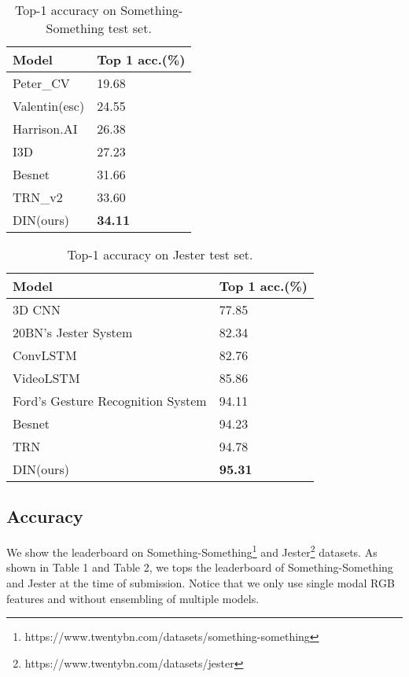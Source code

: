 \documentclass{article}
\begin{document}
\begin{table}[t]
\centering
\renewcommand\arraystretch{1.2}
\caption{Top-1 accuracy on Something-Something test set.}
\begin{tabular}{p{5cm} p{2cm}<{\centering}}
\toprule[1.4pt]
Model&Top 1 acc.(\%)\\
\hline
Peter\_CV&19.68\\
Valentin(esc)&24.55\\
Harrison.AI&26.38\\
I3D&27.23\\
Besnet&31.66\\
TRN\_v2&33.60\\
\hline
DIN(ours)&\textbf{34.11}\\

\bottomrule[1.5pt]

\end{tabular}
\end{table}


\begin{table}[t]
\centering
\renewcommand\arraystretch{1.2}
\caption{Top-1 accuracy on Jester test set.}
\begin{tabular}{p{5cm} p{2cm}<{\centering}}
\toprule[1.4pt]
Model&Top 1 acc.(\%)\\
\hline
3D CNN&77.85\\
20BN's Jester System&82.34\\
ConvLSTM&82.76\\
VideoLSTM&85.86\\
Ford's Gesture Recognition System&94.11\\
Besnet&94.23\\
TRN&94.78\\
\hline
DIN(ours)&\textbf{95.31}\\

\bottomrule[1.5pt]

\end{tabular}
\end{table}

\subsection{Accuracy}
We show the leaderboard on Something-Something\footnote{https://www.twentybn.com/datasets/something-something} and Jester\footnote{https://www.twentybn.com/datasets/jester} datasets. As shown in Table 1 and Table 2, we tops the leaderboard of Something-Something and Jester at the time of submission. Notice that we only use single modal RGB features and without ensembling of multiple models.
\end{document}
